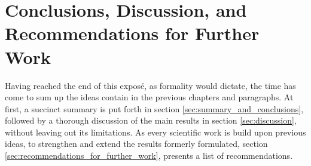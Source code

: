 \documentclass[thesis.tex]{subfiles}
\begin{document}
	\chapter[Conclusions]{Conclusions, Discussion, and Recommendations for Further Work}
	\label{ch:conclusions}
	Having reached the end of this expos\'e, as formality would dictate, the time has come to sum up the ideas contain in the previous chapters and paragraphs. At first, a succinct summary is put forth in section \ref{sec:summary_and_conclusions}, followed by a thorough discussion of the main results in section \ref{sec:discussion}, without leaving out its limitations. As every scientific work is build upon previous ideas, to strengthen and extend the results formerly formulated, section \ref{sec:recommendations_for_further_work}, presents a list of recommendations.
	
\end{document}
